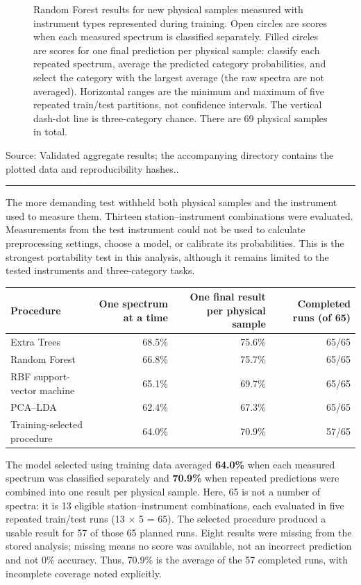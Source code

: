 \documentclass[10pt]{article}
\newcommand{\metric}[1]{\textbf{#1}}
\newcommand{\source}[1]{{\scriptsize Source: #1.}}
\newcommand{\sectiontitle}[1]{\vspace{2pt}{\large\bfseries #1}\par\vspace{1pt}\hrule\vspace{3pt}}
\begin{document}
\begin{figure}[H]
\centering

\caption{\label{fig:r1}Random Forest results for new physical samples measured with instrument types represented during training. Open circles are scores when each measured spectrum is classified separately. Filled circles are scores for one final prediction per physical sample: classify each repeated spectrum, average the predicted category probabilities, and select the category with the largest average (the raw spectra are not averaged). Horizontal ranges are the minimum and maximum of five repeated train/test partitions, not confidence intervals. The vertical dash-dot line is three-category chance. There are 69 physical samples in total.}
\end{figure}
\source{Validated aggregate results; the accompanying directory contains the plotted data and reproducibility hashes.}

\newpage
\sectiontitle{3. What changes for an instrument not used in training?}
The more demanding test withheld both physical samples and the instrument used to measure them. Thirteen station--instrument combinations were evaluated. Measurements from the test instrument could not be used to calculate preprocessing settings, choose a model, or calibrate its probabilities. This is the strongest portability test in this analysis, although it remains limited to the tested instruments and three-category tasks.

\begin{center}
\small
\begin{tabular}{lrrr}
\toprule
Procedure & One spectrum at a time & One final result per physical sample & Completed runs (of 65)\\
\midrule
Extra Trees & 68.5\% & 75.6\% & 65/65\\
Random Forest & 66.8\% & 75.7\% & 65/65\\
RBF support-vector machine & 65.1\% & 69.7\% & 65/65\\
PCA--LDA & 62.4\% & 67.3\% & 65/65\\
Training-selected procedure & 64.0\% & 70.9\% & 57/65\\
\bottomrule
\end{tabular}
\end{center}

The model selected using training data averaged \metric{64.0\%} when each measured spectrum was classified separately and \metric{70.9\%} when repeated predictions were combined into one result per physical sample. Here, 65 is not a number of spectra: it is 13 eligible station--instrument combinations, each evaluated in five repeated train/test runs (13 $\times$ 5 = 65). The selected procedure produced a usable result for 57 of those 65 planned runs. Eight results were missing from the stored analysis; missing means no score was available, not an incorrect prediction and not 0\% accuracy. Thus, 70.9\% is the average of the 57 completed runs, with incomplete coverage noted explicitly.
\end{document}

